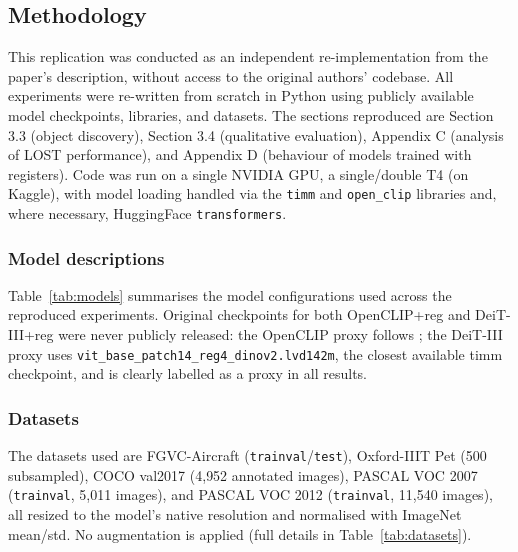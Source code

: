 \subsection{Methodology}
This replication was conducted as an independent re-implementation from the paper's description, without access to the original authors' codebase. All experiments were re-written from scratch in Python using publicly available model checkpoints, libraries, and datasets. The sections reproduced are Section 3.3 (object discovery), Section 3.4 (qualitative evaluation), Appendix C (analysis of LOST performance), and Appendix D (behaviour of models trained with registers). Code was run on a single NVIDIA GPU, a single/double T4 (on Kaggle), with model loading handled via the \texttt{timm} and \texttt{open\_clip} libraries and, where necessary, HuggingFace \texttt{transformers}.

\subsubsection{Model descriptions}
Table~\ref{tab:models} summarises the model configurations used across the reproduced experiments.
Original checkpoints for both OpenCLIP+reg and DeiT-III+reg were never publicly released: the OpenCLIP proxy follows \citet{jiang2025vision}; the DeiT-III proxy uses \texttt{vit\_base\_patch14\_reg4\_dinov2.lvd142m}, the closest available timm checkpoint, and is clearly labelled as a proxy in all results.

\subsubsection{Datasets}
The datasets used are FGVC-Aircraft (\texttt{trainval}/\texttt{test}), Oxford-IIIT Pet (500 subsampled),
COCO val2017 (4{,}952 annotated images), PASCAL VOC 2007 (\texttt{trainval}, 5{,}011 images), and
PASCAL VOC 2012 (\texttt{trainval}, 11{,}540 images), all resized to the model's native resolution and
normalised with ImageNet mean/std. No augmentation is applied (full details in Table~\ref{tab:datasets}).

